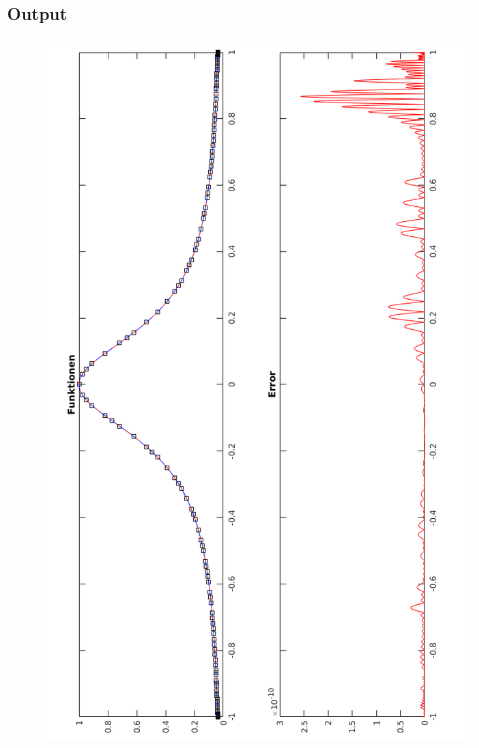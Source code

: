 \documentclass[ngerman,12pt]{article}
\begin{document}
\subsubsection*{Output}
\begin{figure}[H]
    \includegraphics[height=0.93\textheight,keepaspectratio]{final_wf.png}
\end{figure}
\end{document}
